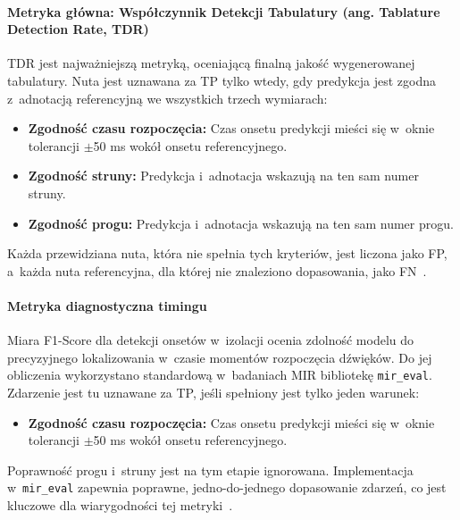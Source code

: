 \paragraph{Metryka główna: Współczynnik Detekcji Tabulatury (ang. Tablature Detection Rate, TDR)}
TDR jest najważniejszą metryką, oceniającą finalną jakość wygenerowanej tabulatury. Nuta jest uznawana za TP tylko wtedy, gdy predykcja jest zgodna z~adnotacją referencyjną we wszystkich trzech wymiarach:
\begin{itemize}
    \item \textbf{Zgodność czasu rozpoczęcia:} Czas onsetu predykcji mieści się w~oknie tolerancji $\pm$50 ms wokół onsetu referencyjnego.
    \item \textbf{Zgodność struny:} Predykcja i~adnotacja wskazują na ten sam numer struny.
    \item \textbf{Zgodność progu:} Predykcja i~adnotacja wskazują na ten sam numer progu.
\end{itemize}
Każda przewidziana nuta, która nie spełnia tych kryteriów, jest liczona jako FP, a~każda nuta referencyjna, dla której nie znaleziono dopasowania, jako FN~\autocite{Wiggins2019TabCNN}.

\paragraph{Metryka diagnostyczna timingu}
Miara F1-Score dla detekcji onsetów w~izolacji ocenia zdolność modelu do precyzyjnego lokalizowania w~czasie momentów rozpoczęcia dźwięków. Do jej obliczenia wykorzystano standardową w~badaniach MIR bibliotekę \texttt{mir\_eval}. Zdarzenie jest tu uznawane za TP, jeśli spełniony jest tylko jeden warunek:
\begin{itemize}
    \item \textbf{Zgodność czasu rozpoczęcia:} Czas onsetu predykcji mieści się w~oknie tolerancji $\pm$50 ms wokół onsetu referencyjnego.
\end{itemize}
Poprawność progu i~struny jest na tym etapie ignorowana. Implementacja w~\texttt{mir\_eval} zapewnia poprawne, jedno-do-jednego dopasowanie zdarzeń, co jest kluczowe dla wiarygodności tej metryki~\autocite{Benetos2019AutomaticMusicTranscription}.

